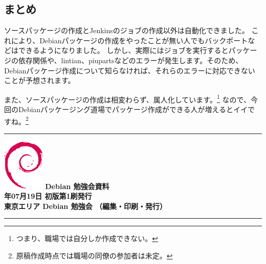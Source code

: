\documentclass[mingoth,a4paper]{jsarticle}
\newcommand{\debmtgyear}{2014}
\newcommand{\debmtgmonth}{07}
\newcommand{\debmtgdate}{19}
\begin{document}
\subsection{まとめ}

ソースパッケージの作成とJenkinsのジョブの作成以外は自動化できました。
これにより、Debianパッケージの作成をやったことが無い人でもバックポートなどはできるようになりました。
しかし、実際にはジョブを実行するとパッケージの依存関係や、lintian、piupartsなどのエラーが発生します。そのため、Debianパッケージ作成について知らなければ、それらのエラーに対応できないことが予想されます。

また、ソースパッケージの作成は相変わらず、属人化しています。\footnote{つまり、職場では自分しか作成できない。}
なので、今回のDebianパッケージング道場でパッケージ作成ができる人が増えるとイイですね。\footnote{原稿作成時点では職場の同僚の参加者は未定。}

\printindex

\cleartooddpage

\vspace*{15cm}
\hrule
\vspace{2mm}
\includegraphics[width=2cm]{image200502/openlogo-nd.eps}
\noindent \Large \bf Debian 勉強会資料\\
\noindent \normalfont \debmtgyear{}年\debmtgmonth{}月\debmtgdate{}日 \hspace{5mm}  初版第1刷発行\\
\noindent \normalfont 東京エリア Debian 勉強会 （編集・印刷・発行）\\
\hrule
\end{document}
